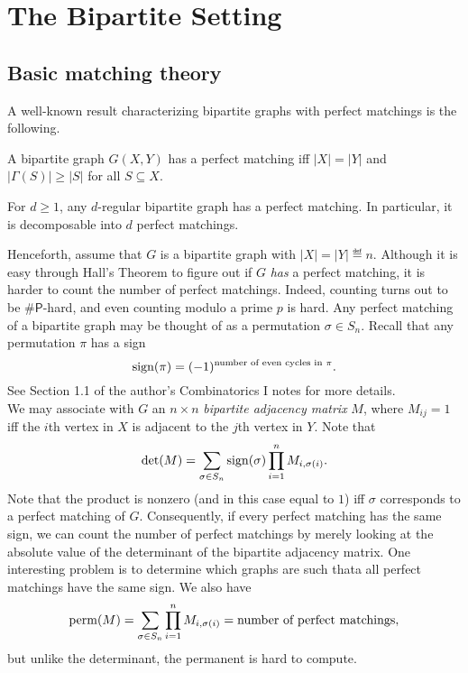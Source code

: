 
\section{The Bipartite Setting}


\subsection{Basic matching theory}

A well-known result characterizing bipartite graphs with perfect matchings is the following.

\begin{ftheo}
	A bipartite graph $G(X,Y)$ has a perfect matching iff $|X|=|Y|$ and $|\Gamma(S)| \ge |S|$ for all $S \subseteq X$.
\end{ftheo}

\begin{fcor}
	For $d \ge 1$, any $d$-regular bipartite graph has a perfect matching. In particular, it is decomposable into $d$ perfect matchings.
\end{fcor}

Henceforth, assume that $G$ is a bipartite graph with $|X|=|Y|\eqdef n$. Although it is easy through Hall's Theorem to figure out if $G$ \emph{has} a perfect matching, it is harder to count the number of perfect matchings. Indeed, counting turns out to be $\#\mathsf{P}$-hard, and even counting modulo a prime $p$ is hard. Any perfect matching of a bipartite graph may be thought of as a permutation $\sigma \in S_n$. Recall that any permutation $\pi$ has a sign
\[ \operatorname{sign}(\pi) = (-1)^{\text{number of even cycles in $\pi$}}. \]
See Section 1.1 of the author's Combinatorics I notes for more details.\\

We may associate with $G$ an $n \times n$ \emph{bipartite adjacency matrix} $M$, where $M_{ij} = 1$ iff the $i$th vertex in $X$ is adjacent to the $j$th vertex in $Y$. Note that
\[ \det(M) = \sum_{\sigma \in S_n} \operatorname{sign}(\sigma) \prod_{i=1}^n M_{i,\sigma(i)}. \]
Note that the product is nonzero (and in this case equal to $1$) iff $\sigma$ corresponds to a perfect matching of $G$. Consequently, if every perfect matching has the same sign, we can count the number of perfect matchings by merely looking at the absolute value of the determinant of the bipartite adjacency matrix. One interesting problem is to determine which graphs are such thata all perfect matchings have the same sign. We also have
\[ \operatorname{perm}(M) = \sum_{\sigma \in S_n} \prod_{i=1}^n M_{i,\sigma(i)} = \text{number of perfect matchings}, \]
but unlike the determinant, the permanent is hard to compute.\\

